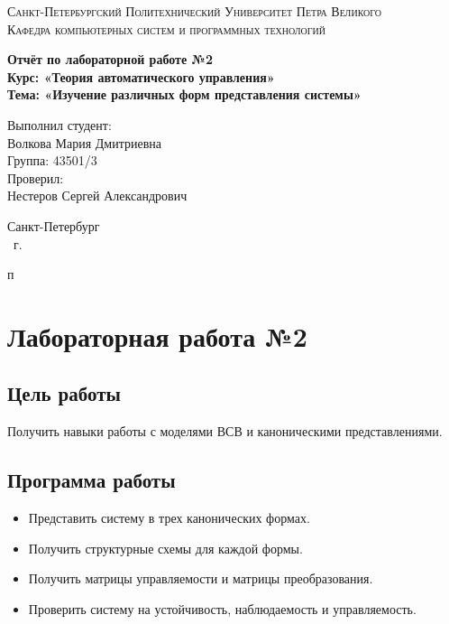 \documentclass[14pt,a4paper,report]{report}
\begin{document}
\def\contentsname{Содержание}

\begin{titlepage}
	\begin{center}
		\textsc{Санкт-Петербургский Политехнический 
			Университет Петра Великого\\[5mm]
			Кафедра компьютерных систем и программных технологий}
		
		\vfill
		
		\textbf{Отчёт по лабораторной работе №2\\[3mm]
			Курс: «Теория автоматического управления»\\[3mm]
			Тема: «Изучение различных форм представления системы»\\[35mm]
			}
	\end{center}
	
	\hfill
	\begin{minipage}{.5\textwidth}
		Выполнил студент:\\[2mm] 
		Волкова Мария Дмитриевна\\
		Группа: 43501/3\\[5mm]
		
		Проверил:\\[2mm] 
		Нестеров Сергей Александрович
	\end{minipage}
	\vfill
	\begin{center}
		Санкт-Петербург\\ \the\year\ г.
	\end{center}
\end{titlepage}

\tableofcontents


п\chapter{Лабораторная работа №2}

\section{Цель работы}

Получить навыки работы с моделями ВСВ и каноническими представлениями.

\section{Программа работы}

\begin{itemize}
	\item Представить систему в трех канонических формах.
	\item Получить структурные схемы для каждой формы.
	\item Получить матрицы управляемости и матрицы преобразования.
	\item Проверить систему на устойчивость, наблюдаемость и управляемость.
\end{itemize}
\end{document}
